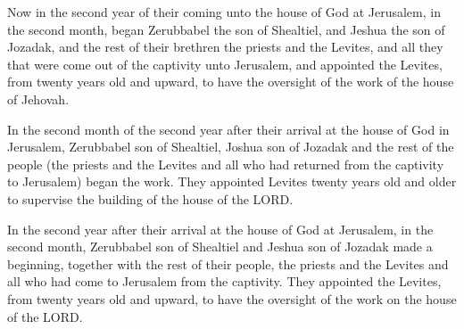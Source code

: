 			\begin{versebox}
					\item[BHS] 
					\item[LXX] 
					\item[ASV] Now in the second year of their coming unto the house of God at Jerusalem, in the second month, began Zerubbabel the son of Shealtiel, and Jeshua the son of Jozadak, and the rest of their brethren the priests and the Levites, and all they that were come out of the captivity unto Jerusalem, and appointed the Levites, from twenty years old and upward, to have the oversight of the work of the house of Jehovah.
					\item[NIV] In the second month of the second year after their arrival at the house of God in Jerusalem, Zerubbabel son of Shealtiel, Joshua son of Jozadak and the rest of the people (the priests and the Levites and all who had returned from the captivity to Jerusalem) began the work. They appointed Levites twenty years old and older to supervise the building of the house of the LORD.
					\item[NRSV] In the second year after their arrival at the house of God at Jerusalem, in the second month, Zerubbabel son of Shealtiel and Jeshua son of Jozadak made a beginning, together with the rest of their people, the priests and the Levites and all who had come to Jerusalem from the captivity. They appointed the Levites, from twenty years old and upward, to have the oversight of the work on the house of the LORD.
			\end{versebox}

